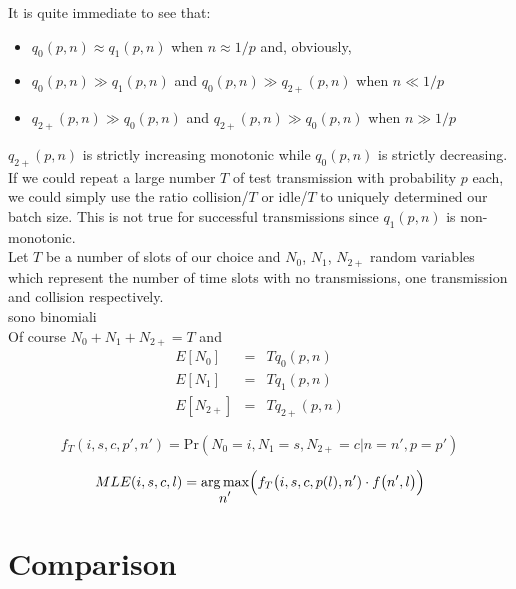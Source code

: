 \documentclass[12pt,a4paper]{report}
\DeclareMathOperator*{\argmax}{arg\,max}
\begin{document}
It is quite immediate to see that:
\begin{itemize}
\item $q_{0}(p,n) \approx q_{1}(p,n)$ when $n\approx 1/p$ and, obviously,
\item $q_{0}(p,n) \gg q_{1}(p,n)$ and $q_{0}(p,n) \gg q_{2+}(p,n)$ when $n \ll 1/p$
\item $q_{2+}(p,n) \gg q_{0}(p,n)$ and $q_{2+}(p,n) \gg q_{0}(p,n)$ when $n \gg 1/p$
\end{itemize}
$q_{2+}(p,n)$ is strictly increasing monotonic while $q_{0}(p,n)$ is strictly decreasing. If we could repeat a large number $T$ of test transmission with  probability $p$ each, we could simply use the ratio collision/$T$ or idle/$T$ to uniquely determined our batch size. This is not true for successful transmissions since $q_{1}(p,n)$ is non-monotonic.\\
 
 Let $T$ be a number of slots of our choice and $N_{0}$, $N_{1}$, $N_{2+}$ random variables which represent the number of time slots with no transmissions, one transmission and collision respectively.\\
 sono binomiali\\
 Of course $N_{0}+N_{1}+N_{2+}=T$ and
 \begin{eqnarray*}
E[N_{0}] &=& Tq_{0}(p,n)\\
E[N_{1}] &=& Tq_{1}(p,n)\\
E[N_{2+}] &=& Tq_{2+}(p,n)
\end{eqnarray*}


\begin{equation}
f_{T}(i,s,c,p',n')= \textrm{Pr}(N_{0}=i,N_{1}=s,N_{2+}=c|n=n',p=p')
\end{equation}

\begin{equation}
MLE(i,s,c,l)=\argmax_{\displaystyle{n'}} \Bigl( f_{T}\bigl(i,s,c,p(l),n')\cdot f\bigl(n',l\bigr)\Bigr)
\end{equation}

\chapter{Comparison}
\label{ch:Comparison}
\end{document}
